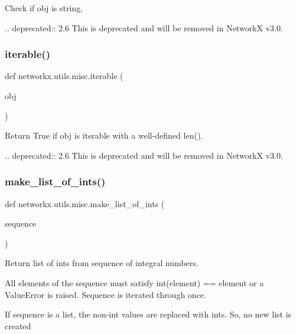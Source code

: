 \begin{DoxyVerb}Check if obj is string.

.. deprecated:: 2.6
    This is deprecated and will be removed in NetworkX v3.0.
\end{DoxyVerb}
 \mbox{\label{namespacenetworkx_1_1utils_1_1misc_ae65f2c291dc1744406702c19798e65ec}} 
\subsubsection{\texorpdfstring{iterable()}{iterable()}}
{\footnotesize\ttfamily def networkx.\+utils.\+misc.\+iterable (\begin{DoxyParamCaption}\item[{}]{obj }\end{DoxyParamCaption})}

\begin{DoxyVerb}Return True if obj is iterable with a well-defined len().

.. deprecated:: 2.6
    This is deprecated and will be removed in NetworkX v3.0.
\end{DoxyVerb}
 \mbox{\label{namespacenetworkx_1_1utils_1_1misc_a18436e33d258df06eeba2a18d9e543c6}} 
\subsubsection{\texorpdfstring{make\+\_\+list\+\_\+of\+\_\+ints()}{make\_list\_of\_ints()}}
{\footnotesize\ttfamily def networkx.\+utils.\+misc.\+make\+\_\+list\+\_\+of\+\_\+ints (\begin{DoxyParamCaption}\item[{}]{sequence }\end{DoxyParamCaption})}

\begin{DoxyVerb}Return list of ints from sequence of integral numbers.

All elements of the sequence must satisfy int(element) == element
or a ValueError is raised. Sequence is iterated through once.

If sequence is a list, the non-int values are replaced with ints.
So, no new list is created
\end{DoxyVerb}
 \mbox{\label{namespacenetworkx_1_1utils_1_1misc_a4b8c7a6a6815b9b4c620f5942fafc93f}} 
